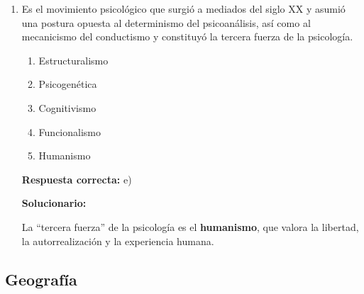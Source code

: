 \begin{enumerate}[resume]
	\vspace{2mm}
	\textbf{Solucionario:}
	
	La emoción se manifiesta con gran fuerza fisiológica; por ello corresponde a la \textbf{intensidad} del proceso afectivo.
	
	
	
	\vspace{6mm}
	
	\item Es el movimiento psicológico que surgió a mediados del siglo XX y asumió una postura opuesta al determinismo del psicoanálisis, así como al mecanicismo del conductismo y constituyó la tercera fuerza de la psicología.
	\begin{enumerate}[label=\alph*)]
		\item Estructuralismo
		\item Psicogenética
		\item Cognitivismo
		\item Funcionalismo
		\item Humanismo
	\end{enumerate}
	\textbf{Respuesta correcta:} e)
	
	\vspace{2mm}
	\textbf{Solucionario:}
	
	La ``tercera fuerza'' de la psicología es el \textbf{humanismo}, que valora la libertad, la autorrealización y la experiencia humana.
	

	
	\vspace{6mm}
\end{enumerate}

\subsection*{Geografía}

